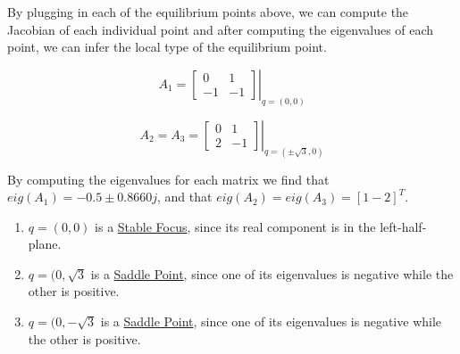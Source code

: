 \noindent By plugging in each of the equilibrium points above, we can compute the Jacobian of each individual point and after computing the eigenvalues of each point, we can infer the local type of the equilibrium point.


$$
A_{1}= \left. \left[\begin{array}{cc}
0 & 1 \\
-1 & -1
\end{array}\right] \right|_{q=(0,0)}
$$


$$
A_{2}=A_{3}=\left. \left[\begin{array}{ll}
0 & 1 \\
2 & -1
\end{array}\right] \right|_{q=(\pm \sqrt{3}, 0)}
$$


\noindent By computing the eigenvalues for each matrix we find that  $eig(A_1) = -0.5 \pm 0.8660j$, and that $eig(A_2)=eig(A_3) = [1 -2]^T$.

\begin{enumerate}
  \item $q = (0,0)$ is a \underline{Stable Focus}, since its real component is in the left-half-plane.
  \item $q = (0, \sqrt{3}$ is a \underline{Saddle Point}, since one of its eigenvalues is negative while the other is positive.
  \item $q = (0, -\sqrt{3}$ is a \underline{Saddle Point}, since one of its eigenvalues is negative while the other is positive.
\end{enumerate}
